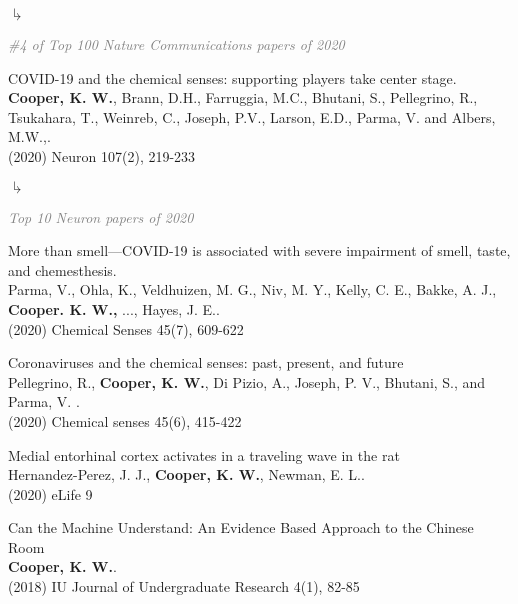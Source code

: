 \documentclass[10pt]{cooperCV2}
\begin{document}
\begin{etaremune}[resume,itemindent=-1.5\bibhang, topsep=0pt,
				   itemsep=\bibsep,partopsep=0pt,parsep=0pt,leftmargin={\bibhang+\widthof{[999]}}]
     	\begin{list}{$\drsh$}{}
     	
	      \item \textcolor{grey}{\textit{\#4 of Top 100 Nature Communications papers of 2020} }
     	
     	\end{list} 
     
	
    \item COVID-19 and the chemical senses: supporting players take center stage. \\
     \textbf{Cooper, K. W.}, Brann, D.H., Farruggia, M.C., Bhutani, S., Pellegrino, R., Tsukahara, T., Weinreb, C., Joseph, P.V., Larson, E.D., Parma, V. and Albers, M.W.,. \\ (2020) Neuron 107(2), 219-233
     
     	\begin{list}{$\drsh$}{}
     	
	      \item \textcolor{grey}{\textit{Top 10 Neuron papers of 2020} }
     	
     	\end{list} 
     
	
    \item More than smell—COVID-19 is associated with severe impairment of smell, taste, and chemesthesis. \\
     Parma, V., Ohla, K., Veldhuizen, M. G., Niv, M. Y., Kelly, C. E., Bakke, A. J., \textbf{Cooper. K. W.,} ..., Hayes, J. E.. \\ (2020) Chemical Senses 45(7), 609-622
     
	
    \item Coronaviruses and the chemical senses: past, present, and future \\
     Pellegrino, R., \textbf{Cooper, K. W.}, Di Pizio, A., Joseph, P. V., Bhutani, S., and Parma, V. . \\ (2020) Chemical senses 45(6), 415-422
     
	
    \item Medial entorhinal cortex activates in a traveling wave in the rat \\
     Hernandez-Perez, J. J., \textbf{Cooper, K. W.}, Newman, E. L.. \\ (2020) eLife 9
     
	
    \item Can the Machine Understand: An Evidence Based Approach to the Chinese Room \\
     \textbf{Cooper, K. W.}. \\ (2018) IU Journal of Undergraduate Research 4(1), 82-85
     
	

\end{etaremune}
\end{document}
